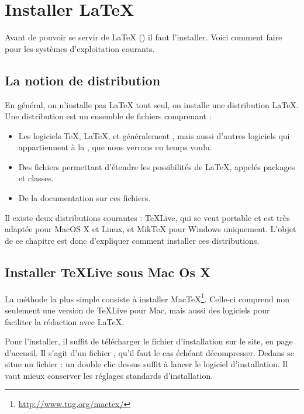 \chapter {Installer \LaTeX{}}\label{install}

\begin{prealable}
	Avant de pouvoir se servir de \LaTeX{} (\XeLaTeX) il faut l'installer. Voici comment faire pour les systèmes d'exploitation courants.
\end{prealable}

\section{La notion de distribution}

En général, on n'installe pas \LaTeX{} tout seul, on installe une distribution \LaTeX{}. Une distribution est un ensemble de fichiers comprenant :
\begin{itemize}
\item Les logiciels \TeX, \LaTeX, et généralement \XeLaTeX, mais aussi d'autres logiciels qui appartiennent à la  , que nous verrons en temps voulu.
\item Des fichiers permettant d'étendre les possibilités de \LaTeX, appelés packages et classes.
\item De la documentation sur ces fichiers.
\end{itemize}

Il existe deux distributions courantes : TeXLive, qui se veut portable et est très adaptée  pour MacOS X et Linux, et MikTeX pour Windows uniquement. L'objet de ce chapitre est donc d'expliquer comment installer ces distributions.

\section{Installer TeXLive sous Mac Os X}

La méthode la plus simple consiste à installer MacTeX\footnote{\url{http://www.tug.org/mactex/}}. Celle-ci comprend non seulement une version de TeXLive pour Mac, mais aussi des logiciels pour faciliter la rédaction avec \LaTeX{}.

Pour l'installer, il suffit de télécharger le fichier d'installation sur le site, en page d'accueil. Il s'agit d'un fichier , qu'il faut le cas échéant décompresser. Dedans se situe un fichier  : un double clic dessus suffit à lancer le logiciel d'installation. Il vaut mieux conserver les réglages standards d'installation.

